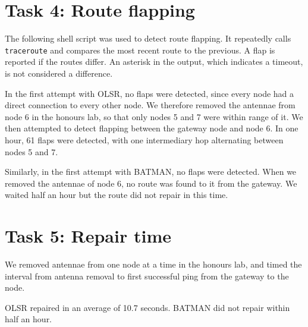 \documentclass[10pt,DIV=9]{scrartcl}
\begin{document}
\section{Task 4: Route flapping}

The following shell script was used to detect route flapping.  It repeatedly calls \texttt{traceroute} and compares the most recent route to the previous.  A flap is reported if the routes differ.  An asterisk in the output, which indicates a timeout, is not considered a difference.

\noindent
\begin{minipage}{\linewidth}
  
\end{minipage}

In the first attempt with OLSR, no flaps were detected, since every node had a direct connection to every other node.  We therefore removed the antennae from node 6 in the honours lab, so that only nodes 5 and 7 were within range of it.  We then attempted to detect flapping between the gateway node and node 6.  In one hour, 61 flaps were detected, with one intermediary hop alternating between nodes 5 and 7.

Similarly, in the first attempt with BATMAN, no flaps were detected.  When we removed the antennae of node 6, no route was found to it from the gateway.  We waited half an hour but the route did not repair in this time.

\section{Task 5: Repair time}

We removed antennae from one node at a time in the honours lab, and timed the interval from antenna removal to first successful ping from the gateway to the node.

OLSR repaired in an average of 10.7 seconds.  BATMAN did not repair within half an hour.
\end{document}

